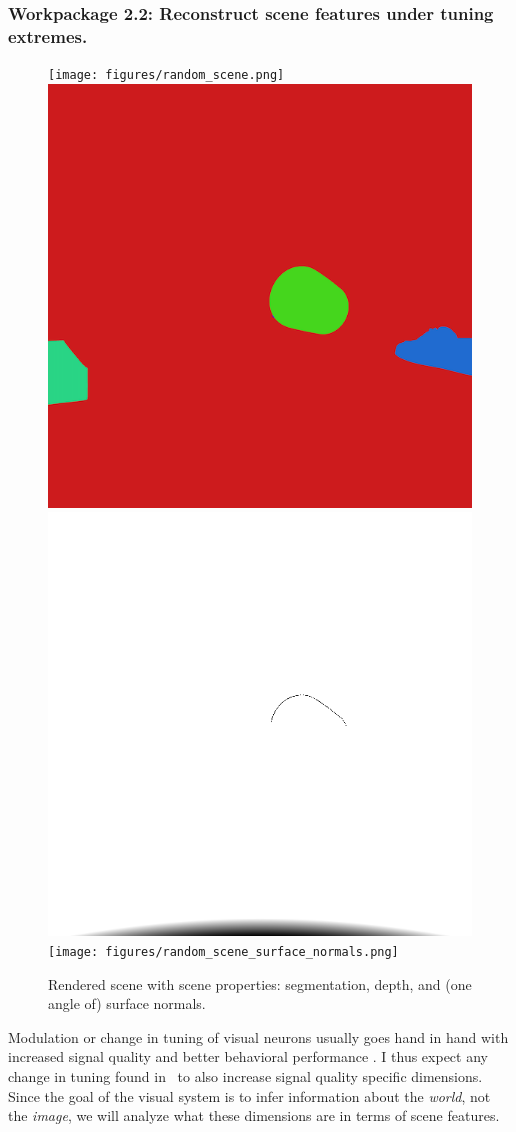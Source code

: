 \documentclass[B2,COG]{ercgrant}
\begin{document}
\subsubsection{Workpackage 2.2: Reconstruct scene features under tuning extremes. \hfill {}}
\begin{figure}
\texttt{[image: figures/random\_scene.png]}
\includegraphics[height=.24\linewidth]{figures/random_scene_segmentation.png}
\includegraphics[height=.24\linewidth]{figures/random_scene_depth.png}
\texttt{[image: figures/random\_scene\_surface\_normals.png]}
\caption{Rendered scene with scene properties: segmentation, depth, and (one angle of) surface normals.\label{fig:o2wp2}}
\end{figure}
Modulation or change in tuning of visual neurons usually goes hand in hand with increased signal quality and better behavioral performance \parencite{Spitzer1988-kq, Bennett2013-rk, Dadarlat2017-jw, De_Gee2022-ir}.
I thus expect any change in tuning found in~ to also increase signal quality specific dimensions.
Since the goal of the visual system is to infer information about the \textit{world}, not the \textit{image}, we will analyze what these dimensions are in terms of scene features. 
\end{document}
